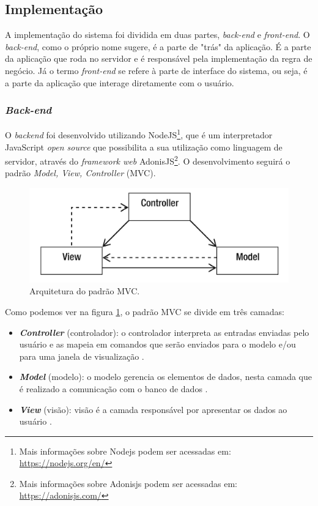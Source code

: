 \subsection{Implementação}
A implementação do sistema foi dividida em duas partes, \textit{back-end} e \textit{front-end}. O \textit{back-end}, como o próprio nome sugere, é a parte de "trás" da aplicação. É a parte da aplicação que roda no servidor e é responsável pela implementação da regra de negócio. Já o termo \textit{front-end} se refere à parte de interface do sistema, ou seja, é a parte da aplicação que interage diretamente com o usuário.

\subsubsection{\textit{Back-end}}
O \textit{backend} foi desenvolvido utilizando NodeJS\footnote[6]{Mais informações sobre Nodejs podem ser acessadas em: \url{https://nodejs.org/en/}}, que é um interpretador JavaScript \textit{open source} que possibilita a sua utilização como linguagem de servidor, através do \textit{framework web} AdonisJS\footnote[7]{Mais informações sobre Adonisjs podem ser acessadas em: \url{https://adonisjs.com/}}. O desenvolvimento seguirá o padrão \textit{Model, View, Controller} (MVC).

\begin{figure}[H]
    \centering
    \includegraphics[scale=1]{04-figuras/mvc.png}
    \caption{Arquitetura do padrão MVC.}
    \vspace{-\baselineskip}
    \label{fig:mvc}
\end{figure}

Como podemos ver na figura \ref{fig:mvc}, o padrão MVC se divide em três camadas:
\begin{itemize}[itemsep=0em]
    \item \textit{\textbf{Controller}} (controlador): o controlador interpreta as entradas enviadas pelo usuário e as mapeia em comandos que serão enviados para o modelo e/ou para uma janela de visualização \cite{dooley2011mvc}.
    \item \textit{\textbf{Model}} (modelo): o modelo gerencia os elementos de dados, nesta camada que é realizado a comunicação com o banco de dados  \cite{dooley2011mvc}.
    \item \textit{\textbf{View}} (visão): visão é a camada responsável por apresentar os dados ao usuário \cite{dooley2011mvc}.
\end{itemize}

